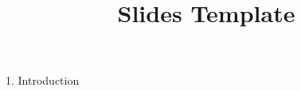 \documentclass[10pt,handout]{beamer}
\title[]{Slides Template}
\begin{document}
\maketitle

\begin{frame}
\begin{center}
\Large 
1. Introduction
\end{center}
\end{frame}
\end{document}
